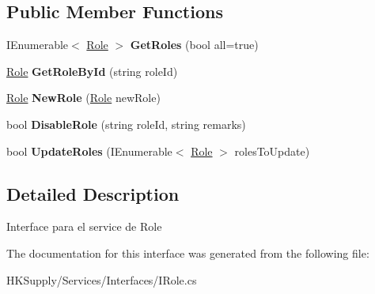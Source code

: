 \subsection*{Public Member Functions}
\begin{DoxyCompactItemize}
\item 
\mbox{\label{interface_h_k_supply_1_1_services_1_1_interfaces_1_1_i_role_a921bacd80020de3cf811705857c9eb7e}} 
I\+Enumerable$<$ \mbox{\hyperlink{class_h_k_supply_1_1_models_1_1_role}{Role}} $>$ {\bfseries Get\+Roles} (bool all=true)
\item 
\mbox{\label{interface_h_k_supply_1_1_services_1_1_interfaces_1_1_i_role_ad83423359435ae70026a1daac5bd07ae}} 
\mbox{\hyperlink{class_h_k_supply_1_1_models_1_1_role}{Role}} {\bfseries Get\+Role\+By\+Id} (string role\+Id)
\item 
\mbox{\label{interface_h_k_supply_1_1_services_1_1_interfaces_1_1_i_role_a7fea1e910bcd64d8e99da8bf4438e50f}} 
\mbox{\hyperlink{class_h_k_supply_1_1_models_1_1_role}{Role}} {\bfseries New\+Role} (\mbox{\hyperlink{class_h_k_supply_1_1_models_1_1_role}{Role}} new\+Role)
\item 
\mbox{\label{interface_h_k_supply_1_1_services_1_1_interfaces_1_1_i_role_a4f5e4bf501b1affbae4d3d39dbb837b5}} 
bool {\bfseries Disable\+Role} (string role\+Id, string remarks)
\item 
\mbox{\label{interface_h_k_supply_1_1_services_1_1_interfaces_1_1_i_role_a0960468c3fb4db4f09b3175106ee7753}} 
bool {\bfseries Update\+Roles} (I\+Enumerable$<$ \mbox{\hyperlink{class_h_k_supply_1_1_models_1_1_role}{Role}} $>$ roles\+To\+Update)
\end{DoxyCompactItemize}


\subsection{Detailed Description}
Interface para el service de Role 



The documentation for this interface was generated from the following file\+:\begin{DoxyCompactItemize}
\item 
H\+K\+Supply/\+Services/\+Interfaces/I\+Role.\+cs\end{DoxyCompactItemize}
